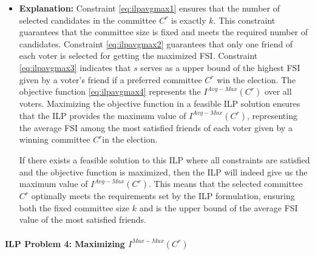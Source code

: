 \documentclass{article}
\begin{document}
\begin{itemize}
\item  \textbf{Explanation:}
Constraint \ref{eq:ilpavgmax1} ensures that the number of selected candidates in the committee \(C^r\) is exactly \(k\). This constraint guarantees that the committee size is fixed and meets the required number of candidates.
Constraint \ref{eq:ilpavgmax2} guarantees that only one friend of each voter is selected for getting the maximized FSI.
Constraint \ref{eq:ilpavgmax3} indicates that \(s\) serves as a upper bound of the highest FSI given by a voter's friend if a preferred committee \(C^r\) win the election.
The objective function \ref{eq:ilpavgmax4} represents the $I^{Avg-Max}(C^{r})$ over all voters. Maximizing  the objective function in a feasible ILP solution ensures that the ILP provides the maximum value of \(I^{Avg-Max}(C^{r})\), representing the average FSI among the most satisfied friends of each voter given by a winning committee \(C^r\)in the election. 

If there exists a feasible solution to this ILP where all constraints are satisfied and the objective function is maximized, then the ILP will indeed give us the maximum value of \(I^{Avg-Max}(C^{r})\). This means that the selected committee \(C^r\) optimally meets the requirements set by the ILP formulation, ensuring both the fixed committee size \(k\) and is the upper bound of the average FSI value of the most satisfied friends. 

\end{itemize}


\paragraph*{ILP Problem 4: Maximizing  $I^{Max-Max}(C^{r})$}\mbox{} \\
\end{document}
